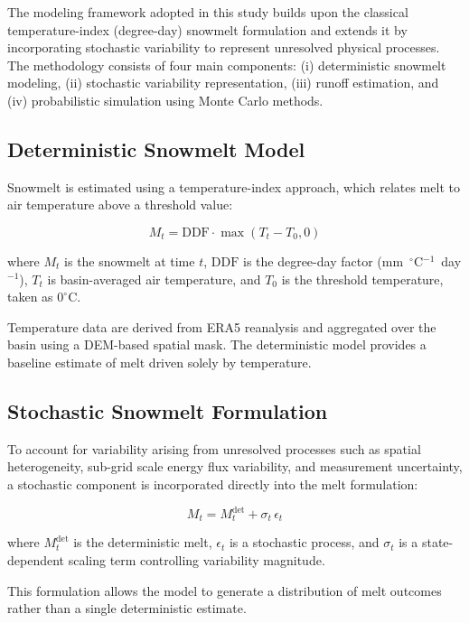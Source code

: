 \documentclass[11pt]{article}
\begin{document}
	The modeling framework adopted in this study builds upon the classical temperature-index (degree-day) snowmelt formulation and extends it by incorporating stochastic variability to represent unresolved physical processes. The methodology consists of four main components: (i) deterministic snowmelt modeling, (ii) stochastic variability representation, (iii) runoff estimation, and (iv) probabilistic simulation using Monte Carlo methods.
	
	\subsection{Deterministic Snowmelt Model}
	
	Snowmelt is estimated using a temperature-index approach, which relates melt to air temperature above a threshold value:
	
	\begin{equation}
		M_t = \mathrm{DDF} \cdot \max(T_t - T_0, 0)
	\end{equation}
	
	where $M_t$ is the snowmelt at time $t$, $\mathrm{DDF}$ is the degree-day factor (mm~$^\circ$C$^{-1}$~day$^{-1}$), $T_t$ is basin-averaged air temperature, and $T_0$ is the threshold temperature, taken as $0^\circ$C.
	
	Temperature data are derived from ERA5 reanalysis and aggregated over the basin using a DEM-based spatial mask. The deterministic model provides a baseline estimate of melt driven solely by temperature.
	
	\subsection{Stochastic Snowmelt Formulation}
	
	To account for variability arising from unresolved processes such as spatial heterogeneity, sub-grid scale energy flux variability, and measurement uncertainty, a stochastic component is incorporated directly into the melt formulation:
	
	\begin{equation}
		M_t = M_t^{\mathrm{det}} + \sigma_t \, \epsilon_t
	\end{equation}
	
	where $M_t^{\mathrm{det}}$ is the deterministic melt, $\epsilon_t$ is a stochastic process, and $\sigma_t$ is a state-dependent scaling term controlling variability magnitude.
	
	This formulation allows the model to generate a distribution of melt outcomes rather than a single deterministic estimate.
	
\end{document}
